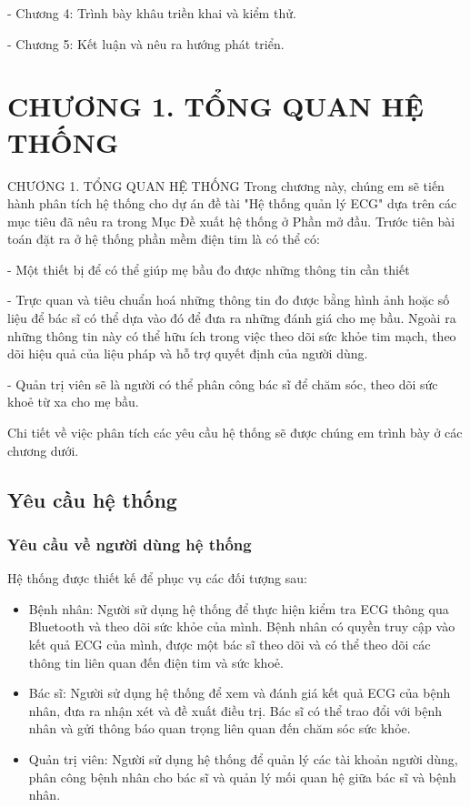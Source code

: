 \documentclass{article}%
\begin{document}
- Chương 4: Trình bày khâu triền khai và kiểm thử.

- Chương 5: Kết luận và nêu ra hướng phát triển.
\cleardoublepage


\section*{CHƯƠNG 1. TỔNG QUAN HỆ THỐNG }
\setcounter{section}{1}
\setcounter{subsection}{0} %
\setcounter{table}{0} %
\setcounter{figure}{0} %
{\numberline{}CHƯƠNG 1. TỔNG QUAN HỆ THỐNG}
Trong chương này, chúng em sẽ tiến hành phân tích hệ thống cho dự án đề tài "Hệ thống quản lý ECG" dựa trên các mục tiêu
đã nêu ra trong Mục Đề xuất hệ thống ở Phần mở đầu. Trước tiên bài toán đặt ra ở hệ thống phần mềm điện tim là có thể có:

- Một thiết bị để có thể giúp mẹ bầu đo được những thông tin cần thiết

- Trực quan và tiêu chuẩn hoá những thông tin đo được
bằng hình ảnh hoặc số liệu để bác sĩ có thể dựa vào đó để đưa ra những đánh giá cho mẹ bầu. Ngoài ra những thông tin này
có thể hữu ích trong việc theo dõi sức khỏe tim mạch, theo dõi hiệu quả của liệu pháp 
và hỗ trợ quyết định của người dùng.

- Quản trị viên sẽ là người có thể phân công bác sĩ để chăm sóc, theo dõi sức khoẻ từ
xa cho mẹ bầu. 

Chi tiết về việc phân tích các yêu cầu hệ thống sẽ được chúng em trình bày ở các chương dưới.

\subsection{Yêu cầu hệ thống}
\subsubsection{Yêu cầu về người dùng hệ thống}
Hệ thống được thiết kế để phục vụ các đối tượng sau:
\begin{itemize}
    \item Bệnh nhân: Người sử dụng hệ thống để thực hiện kiểm tra ECG thông qua Bluetooth và theo dõi sức khỏe của mình. Bệnh nhân có quyền truy cập vào kết quả ECG của mình, được một bác sĩ theo dõi và có thể theo dõi các thông tin liên quan đến điện tim và sức khoẻ.
    \item Bác sĩ: Người sử dụng hệ thống để xem và đánh giá kết quả ECG của bệnh nhân, đưa ra nhận xét và đề xuất điều trị. Bác sĩ có thể trao đổi với bệnh nhân và gửi thông báo quan trọng liên quan đến chăm sóc sức khỏe.
    \item Quản trị viên: Người sử dụng hệ thống để quản lý các tài khoản người dùng, phân công bệnh nhân cho bác sĩ và quản lý mối quan hệ giữa bác sĩ và bệnh nhân.
\end{itemize}
\end{document}
